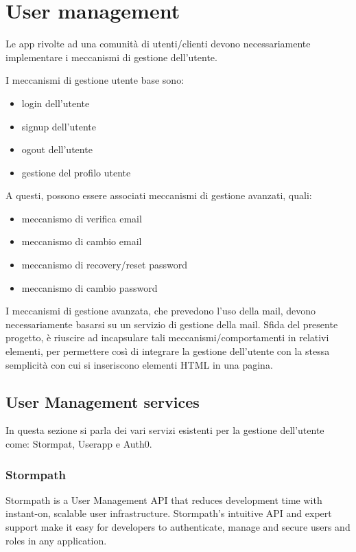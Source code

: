 \section{User management}
\label{sec:USR_user_management}

Le app rivolte ad una comunità di utenti/clienti devono necessariamente implementare i meccanismi di gestione dell'utente.

I meccanismi di gestione utente base sono:
\begin{itemize}
\item login dell'utente
\item signup dell'utente
\item ogout dell'utente
\item gestione del profilo utente
\end{itemize}

A questi, possono essere associati meccanismi di gestione avanzati, quali:
\begin{itemize}
\item meccanismo di verifica email
\item meccanismo di cambio email
\item meccanismo di recovery/reset password
\item meccanismo di cambio password
\end{itemize}

I meccanismi di gestione avanzata, che prevedono l'uso della mail, devono necessariamente basarsi su un servizio di gestione della mail.
Sfida del presente progetto, è riuscire ad incapsulare tali meccanismi/comportamenti in relativi elementi, per permettere così di integrare la gestione dell'utente con la stessa semplicità con cui si inseriscono elementi HTML in una pagina.


\subsection{User Management services}
\label{subsec:USR_user_management_services}
In questa sezione si parla dei vari servizi esistenti per la gestione dell'utente come: Stormpat, Userapp e Auth0.

\subsubsection{Stormpath}

Stormpath is a User Management API that reduces development time with instant-on, scalable user infrastructure. Stormpath's intuitive API and expert support make it easy for developers to authenticate, manage and secure users and roles in any application.


